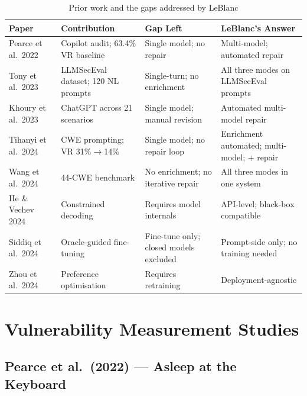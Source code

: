 \documentclass[12pt,a4paper]{report}
\begin{document}
\begin{table}[H]
\centering
\caption{Prior work and the gaps addressed by LeBlanc}
\label{tab:litgap}
\small
\renewcommand{\arraystretch}{1.3}
\begin{tabularx}{\textwidth}{@{}p{1.5in}p{1.5in}p{1.5in}p{1.4in}@{}}
\toprule
\textbf{Paper} & \textbf{Contribution} & \textbf{Gap Left}
               & \textbf{LeBlanc's Answer} \\
\midrule
Pearce et al.\ 2022~\cite{pearce2022asleep}
  & Copilot audit; 63.4\% VR baseline
  & Single model; no repair
  & Multi-model; automated repair \\
Tony et al.\ 2023~\cite{tony2023llmseceval}
  & LLMSecEval dataset; 120 NL prompts
  & Single-turn; no enrichment
  & All three modes on LLMSecEval prompts \\
Khoury et al.\ 2023~\cite{khoury2023secure}
  & ChatGPT across 21 scenarios
  & Single model; manual revision
  & Automated multi-model repair \\
Tihanyi et al.\ 2024~\cite{tihanyi2023secucogenicse}
  & CWE prompting; VR 31\%$\to$14\%
  & Single model; no repair loop
  & Enrichment automated; multi-model; + repair \\
Wang et al.\ 2024~\cite{codeseceval2023}
  & 44-CWE benchmark
  & No enrichment; no iterative repair
  & All three modes in one system \\
He \& Vechev 2024~\cite{codeguard2024}
  & Constrained decoding
  & Requires model internals
  & API-level; black-box compatible \\
Siddiq et al.\ 2024~\cite{hexacoder2024}
  & Oracle-guided fine-tuning
  & Fine-tune only; closed models excluded
  & Prompt-side only; no training needed \\
Zhou et al.\ 2024~\cite{lpo2024}
  & Preference optimisation
  & Requires retraining
  & Deployment-agnostic \\
\bottomrule
\end{tabularx}
\end{table}

\section{Vulnerability Measurement Studies}
\label{sec:litbaseline}

\subsection{Pearce et al.\ (2022) --- Asleep at the Keyboard}
\end{document}
